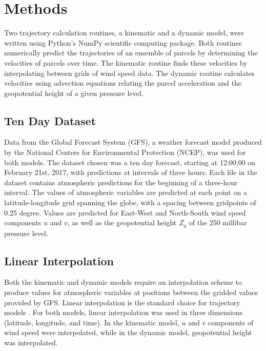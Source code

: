 \chapter{Methods}

Two trajectory calculation routines, a kinematic and a dynamic model, were written using Python's NumPy scientific computing package.
Both routines numerically predict the trajectories of an ensemble of parcels by determining the velocities of parcels over time. 
The kinematic routine finds these velocities by interpolating between grids of wind speed data. 
The dynamic routine calculates velocities using advection equations relating the parcel acceleration and the geopotential height of a given pressure level. 

\section{Ten Day Dataset}
Data from the Global Forecast System (GFS), a weather forecast model produced by the National Centers for Environmental Protection (NCEP), was used for both models.
The dataset chosen was a ten day forecast, starting at 12:00:00 on February 21st, 2017, with predictions at intervals of three hours.
Each file in the dataset contains atmospheric predictions for the beginning of a three-hour interval. 
The values of atmospheric variables are predicted at each point on a latitude-longitude grid spanning the globe, with a spacing between gridpoints of 0.25 degree.
Values are predicted for East-West and North-South wind speed components $u$ and $v$, as well as the geopotential height $Z_g$ of the 250 millibar pressure level.

\section{Linear Interpolation}
Both the kinematic and dynamic models require an interpolation scheme to produce values for atmospheric variables at positions between the gridded values provided by GFS. 
Linear interpolation is the standard choice for trajectory models \cite{bowman_input_2013}. 
For both models, linear interpolation was used in three dimensions (latitude, longitude, and time). 
In the kinematic model, $u$ and $v$ components of wind speed were interpolated, while in the dynamic model, geopotential height was interpolated.

